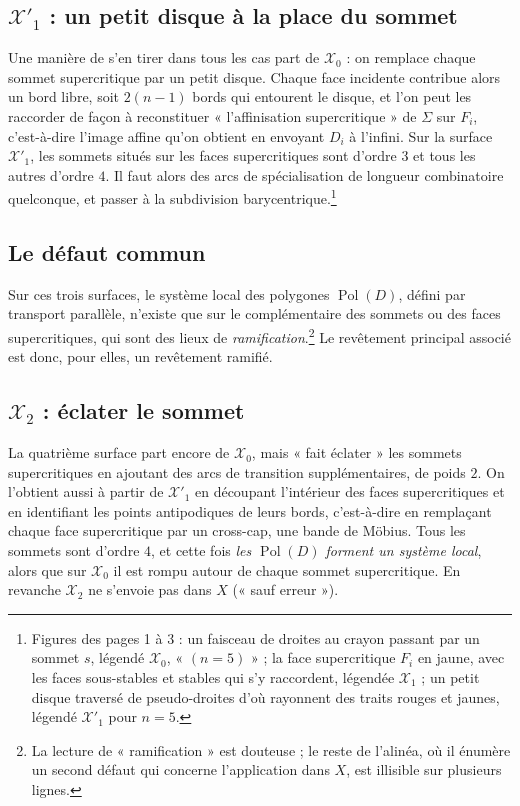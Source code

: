 \documentclass[11pt,a4paper]{article}
\begin{document}
\subsection*{$\mathcal{X}'_1$ : un petit disque à la place du sommet}

Une manière de s'en tirer dans tous les cas part de $\mathcal{X}_0$ : on
remplace chaque sommet supercritique par un petit disque. Chaque face incidente
contribue alors un bord libre, soit $2(n-1)$ bords qui entourent le disque, et
l'on peut les raccorder de façon à reconstituer « l'affinisation
supercritique » de $\Sigma$ sur $F_i$, c'est-à-dire l'image affine qu'on obtient en
envoyant $D_i$ à l'infini. Sur la surface $\mathcal{X}'_1$, les sommets situés
sur les faces supercritiques sont d'ordre $3$ et tous les autres d'ordre $4$. Il
faut alors des arcs de spécialisation de longueur combinatoire quelconque, et
passer à la subdivision barycentrique.\footnote{Figures des pages 1 à 3 : un
faisceau de droites au crayon passant par un sommet $s$, légendé
$\mathcal{X}_0$, « $(n = 5)$ » ; la face supercritique $F_i$ en jaune, avec les
faces sous-stables et stables qui s'y raccordent, légendée $\mathcal{X}_1$ ; un
petit disque traversé de pseudo-droites d'où rayonnent des traits rouges et
jaunes, légendé $\mathcal{X}'_1$ pour $n = 5$.}

\subsection*{Le défaut commun}

Sur ces trois surfaces, le système local des polygones $\operatorname{Pol}(D)$,
défini par transport parallèle, n'existe que sur le complémentaire des sommets
ou des faces supercritiques, qui sont des lieux de
\emph{ramification}.\footnote{La lecture de « ramification » est douteuse ; le
reste de l'alinéa, où il énumère un second défaut qui concerne l'application
dans $X$, est illisible sur plusieurs lignes.} Le revêtement principal associé
est donc, pour elles, un revêtement ramifié.

\subsection*{$\mathcal{X}_2$ : éclater le sommet}

La quatrième surface part encore de $\mathcal{X}_0$, mais « fait éclater » les
sommets supercritiques en ajoutant des arcs de transition supplémentaires, de
poids $2$. On l'obtient aussi à partir de $\mathcal{X}'_1$ en découpant
l'intérieur des faces supercritiques et en identifiant les points antipodiques
de leurs bords, c'est-à-dire en remplaçant chaque face supercritique par un
cross-cap, une bande de Möbius. Tous les sommets sont d'ordre $4$, et cette
fois \emph{les $\operatorname{Pol}(D)$ forment un système local}, alors que sur
$\mathcal{X}_0$ il est rompu autour de chaque sommet supercritique. En
revanche $\mathcal{X}_2$ ne s'envoie pas dans $X$ (« sauf erreur »).
\end{document}
